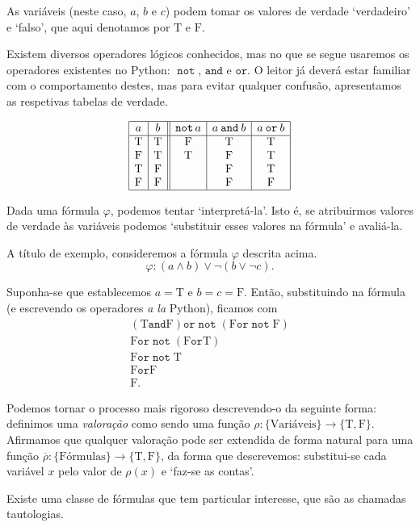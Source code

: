 \documentclass{report}
\theoremstyle{definition}
\theoremstyle{remark}
\newcommand{\lt}{\mathrm{T}}
\newcommand{\lf}{\mathrm{F}}
\DeclareMathOperator{\pnot}{\texttt{not}}
\newcommand{\pand}{\mathbin{\texttt{and}}}
\newcommand{\por}{\mathbin{\texttt{or}}}
\begin{document}
	As variáveis (neste caso, $a$, $b$ e $c$) podem tomar os valores de verdade `verdadeiro' e `falso', que aqui denotamos por $\lt$ e $\lf$.
	
	Existem diversos operadores lógicos conhecidos, mas no que se segue usaremos os operadores existentes no Python: $\pnot$, $\pand$ e $\por$. O leitor já deverá estar familiar com o comportamento destes, mas para evitar qualquer confusão, apresentamos as respetivas tabelas de verdade.
	
	\[\label{tabela:operadores}
	\begin{array}{|c|c||c|c|c|}
	\hline
	a & b & \pnot a & a \pand b & a \por b\\
	\hline
	\lt & \lt & \lf & \lt & \lt\\
	\lf & \lt & \lt & \lf & \lt\\
	\lt & \lf &     & \lf & \lt\\
	\lf & \lf &     & \lf & \lf\\
	\hline
	\end{array}
	\]
	
	Dada uma fórmula $\varphi$, podemos tentar `interpretá-la'. Isto é, se atribuirmos valores de verdade às variáveis podemos `substituir esses valores na fórmula' e avaliá-la.
	
	A título de exemplo, consideremos a fórmula $\varphi$ descrita acima.
	\[\varphi : (a \land b) \lor \neg (b \lor \neg c).\]
	
	Suponha-se que establecemos $a = \lt$ e $b = c = \lf$. Então, substituindo na fórmula (e escrevendo os operadores \textit{a la} Python), ficamos com
	\begin{gather*}
	(\lt \pand \lf) \por \pnot (\lf \por \pnot \lf)\\
	\lf \por \pnot (\lf \por \lt)\\
	\lf \por \pnot \lt\\
	\lf \por \lf\\
	\lf.
	\end{gather*}
	
	Podemos tornar o processo mais rigoroso descrevendo-o da seguinte forma: definimos uma \emph{valoração} como sendo uma função $\rho : \{\text{Variáveis}\} \to \{\lt, \lf\}$. Afirmamos que qualquer valoração pode ser extendida de forma natural para uma função ${\overline\rho : \{\text{Fórmulas}\} \to \{\lt, \lf\}}$, da forma que descrevemos: substitui-se cada variável $x$ pelo valor de $\rho(x)$ e `faz-se as contas'.
	
	Existe uma classe de fórmulas que tem particular interesse, que são as chamadas tautologias.
	
\end{document}
